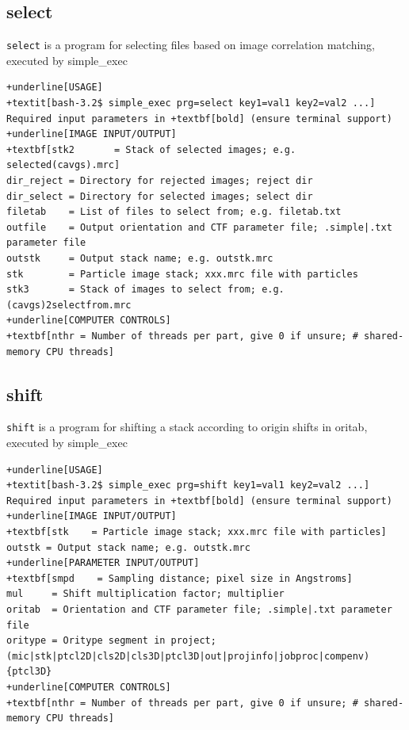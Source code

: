 \documentclass[a4paper,11pt]{article}
\newcommand{\prgname}[1]{\textcolor{NavyBlue}{\texttt{#1}}}
\begin{document}
\subsection{select}
\label{select}
\prgname{select} is a program for selecting files based on image correlation matching, executed by simple\_exec
\begin{Verbatim}[commandchars=+\[\],fontsize=\small,breaklines=true]
+underline[USAGE]
+textit[bash-3.2$ simple_exec prg=select key1=val1 key2=val2 ...]
Required input parameters in +textbf[bold] (ensure terminal support)
+underline[IMAGE INPUT/OUTPUT]
+textbf[stk2       = Stack of selected images; e.g. selected(cavgs).mrc]
dir_reject = Directory for rejected images; reject dir
dir_select = Directory for selected images; select dir
filetab    = List of files to select from; e.g. filetab.txt
outfile    = Output orientation and CTF parameter file; .simple|.txt parameter file
outstk     = Output stack name; e.g. outstk.mrc
stk        = Particle image stack; xxx.mrc file with particles
stk3       = Stack of images to select from; e.g. (cavgs)2selectfrom.mrc
+underline[COMPUTER CONTROLS]
+textbf[nthr = Number of threads per part, give 0 if unsure; # shared-memory CPU threads]
\end{Verbatim}

\subsection{shift}
\label{shift}
\prgname{shift} is a program for shifting a stack according to origin shifts in oritab, executed by simple\_exec
\begin{Verbatim}[commandchars=+\[\],fontsize=\small,breaklines=true]
+underline[USAGE]
+textit[bash-3.2$ simple_exec prg=shift key1=val1 key2=val2 ...]
Required input parameters in +textbf[bold] (ensure terminal support)
+underline[IMAGE INPUT/OUTPUT]
+textbf[stk    = Particle image stack; xxx.mrc file with particles]
outstk = Output stack name; e.g. outstk.mrc
+underline[PARAMETER INPUT/OUTPUT]
+textbf[smpd    = Sampling distance; pixel size in Angstroms]
mul     = Shift multiplication factor; multiplier
oritab  = Orientation and CTF parameter file; .simple|.txt parameter file
oritype = Oritype segment in project; (mic|stk|ptcl2D|cls2D|cls3D|ptcl3D|out|projinfo|jobproc|compenv){ptcl3D}
+underline[COMPUTER CONTROLS]
+textbf[nthr = Number of threads per part, give 0 if unsure; # shared-memory CPU threads]
\end{Verbatim}
\end{document}
